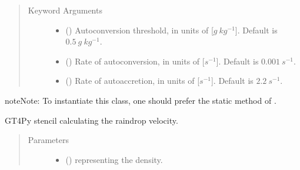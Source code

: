 \documentclass[letterpaper,10pt,english]{sphinxmanual}
\begin{document}
\begin{fulllineitems}
\begin{fulllineitems}
\begin{quote}
\begin{description}
\begin{itemize}
\end{itemize}

\item[{Keyword Arguments}] \leavevmode\begin{itemize}
\item {} 
 () \textendash{} Autoconversion threshold, in units of {[}\(g ~ kg^{-1}\){]}. Default is \(0.5 ~ g ~ kg^{-1}\).

\item {} 
 () \textendash{} Rate of autoconversion, in units of {[}\(s^{-1}\){]}. Default is \(0.001 ~ s^{-1}\).

\item {} 
 () \textendash{} Rate of autoaccretion, in units of {[}\(s^{-1}\){]}. Default is \(2.2 ~ s^{-1}\).

\end{itemize}

\end{description}\end{quote}

\begin{sphinxadmonition}{note}{Note:}
To instantiate this class, one should prefer the static method
{\hyperref[\detokenize{api:tasmania.parameterizations.slow_tendencies.SlowTendencyMicrophysics.factory}]{}} of
{\hyperref[\detokenize{api:tasmania.parameterizations.slow_tendencies.SlowTendencyMicrophysics}]{}}.
\end{sphinxadmonition}

\end{fulllineitems}


\begin{fulllineitems}
\label{\detokenize{api:tasmania.parameterizations.slow_tendency_microphysics_kessler_wrf.SlowTendencyMicrophysicsKesslerWRF._stencil_raindrop_fall_velocity_defs}}
GT4Py stencil calculating the raindrop velocity.
\begin{quote}\begin{description}
\item[{Parameters}] \leavevmode\begin{itemize}
\item {} 
 () \textendash{}  representing the density.


\end{itemize}
\end{description}
\end{quote}
\end{fulllineitems}
\end{fulllineitems}
\end{document}
